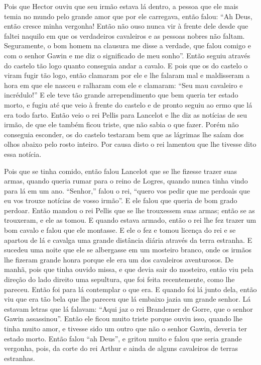Pois que Hector ouviu que seu irmão estava lá dentro, a pessoa que ele mais
temia no mundo pelo grande amor que por ele carregava, então falou: “Ah Deus,
então cresce minha vergonha! Então não ouso nunca vir à frente dele desde que
faltei naquilo em que os verdadeiros cavaleiros e as pessoas nobres não faltam.
Seguramente, o bom homem na clausura me disse a verdade, que falou comigo e com
o senhor Gawin e me diz o significado de meu sonho”. Então seguiu através do
castelo tão logo quanto conseguia andar a cavalo. E pois que os do castelo o
viram fugir tão logo, então clamaram por ele e lhe falaram mal e maldisseram a
hora em que ele nasceu e ralharam com ele e clamaram: “Seu mau cavaleiro e
incrédulo!”  E ele teve tão grande arrependimento que bem queria ter estado
morto, e fugiu até que veio à frente do castelo e de pronto seguiu ao ermo que
lá era todo farto. Então veio o rei Pellis para Lancelot e lhe diz as notícias
de seu irmão, de que ele também ficou triste, que não sabia o que fazer. Porém
não conseguia esconder, os do castelo testaram bem que as lágrimas lhe saíam
dos olhos abaixo pelo rosto inteiro. Por causa disto o rei lamentou que lhe
tivesse dito essa notícia.

Pois que se tinha comido, então falou Lancelot que se lhe fizesse trazer suas
armas, quando queria rumar para o reino de Logres, quando nunca tinha vindo
para lá em um ano. “Senhor,” falou o rei, “quero vos pedir que me perdoais que
eu vos trouxe notícias de vosso irmão”. E ele falou que queria de bom grado
perdoar. Então mandou o rei Pellis que se lhe trouxessem suas armas; então se
as trouxeram, e ele as tomou. E quando estava armado, então o rei lhe fez
trazer um bom cavalo e falou que ele montasse. E ele o fez e tomou licença do
rei e se apartou de lá e cavalga uma grande distância diária através da terra
estranha. E sucedeu uma noite que ele se albergasse em um mosteiro branco, onde
os irmãos lhe fizeram grande honra porque ele era um dos cavaleiros
aventurosos. De manhã, pois que tinha ouvido missa, e que devia sair
do mosteiro, então viu pela direção do lado direito uma sepultura, que foi
feita recentemente, como lhe pareceu. Então foi para lá contemplar o que era. E
quando foi lá junto dela, então viu que era tão bela que lhe pareceu que lá embaixo
jazia um grande senhor. Lá estavam letras que lá falavam: “Aqui jaz o
rei Brandemer de Gorre, que o senhor Gawin assassinou”. Então ele ficou muito
triste porque ouviu isso, quando lhe tinha muito amor, e tivesse sido um outro
que não o senhor Gawin, deveria ter estado morto. Então falou “ah Deus”, e
gritou muito e falou que seria grande vergonha, pois, da corte do rei Arthur e
ainda de alguns cavaleiros de terras estranhas.

